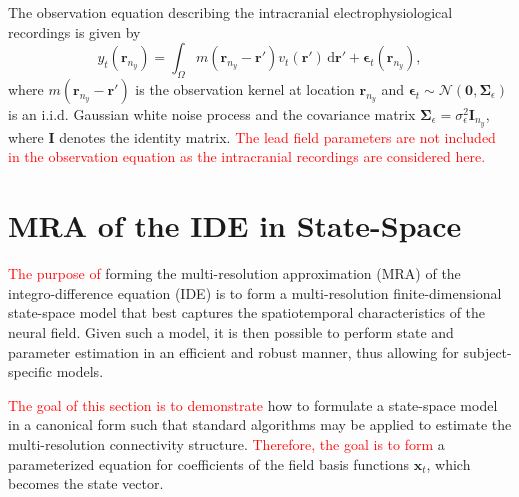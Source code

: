 \documentclass[review,authoryear,3p]{elsarticle}
\newcommand{\parham}[1]{\textcolor{red}{#1}}
\begin{document}
The observation equation describing the intracranial electrophysiological recordings is given by
\begin{equation}\label{eq:ObservationEquation}
	y_t(\mathbf{r}_{n_y}) = \int_{\Omega} { m\left(\mathbf{r}_{n_y}-\mathbf{r}'\right) v_t\left(\mathbf{r}'\right) \, \mathrm{d}\mathbf{r}'} + \boldsymbol\epsilon_t(\mathbf{r}_{n_y}), 
\end{equation}
where $m\left(\mathbf{r}_{n_y}-\mathbf{r}'\right)$ is the observation kernel at location $\mathbf{r}_{n_y}$ and  $\boldsymbol{\epsilon}_{t}\sim \mathcal{N}\left(\mathbf{0},\mathbf{\Sigma}_{\epsilon}\right)$  is an i.i.d. Gaussian white noise process and the covariance matrix $\mathbf{\Sigma}_{\epsilon}=\sigma^2_{\epsilon}\mathbf I_{n_y}$, where $\mathbf I$ denotes the identity matrix. \parham{The lead field parameters are not included in the observation equation as the intracranial recordings are considered here.} 

\section{MRA of the IDE in State-Space}
\parham{The purpose of} forming the multi-resolution approximation (MRA) of the integro-difference equation (IDE) is to form a multi-resolution finite-dimensional state-space model that best captures the spatiotemporal characteristics of the neural field. Given such a model, it is then possible to perform state and parameter estimation in an efficient and robust manner, thus allowing for subject-specific models.

\parham{The goal of this section is to demonstrate} how to formulate a state-space model in a canonical form such that standard algorithms may be applied to estimate the multi-resolution connectivity structure. \parham{Therefore, the goal is to form} a parameterized equation for coefficients of the field basis functions $\mathbf{x}_t$, which becomes the state vector.
\end{document}
